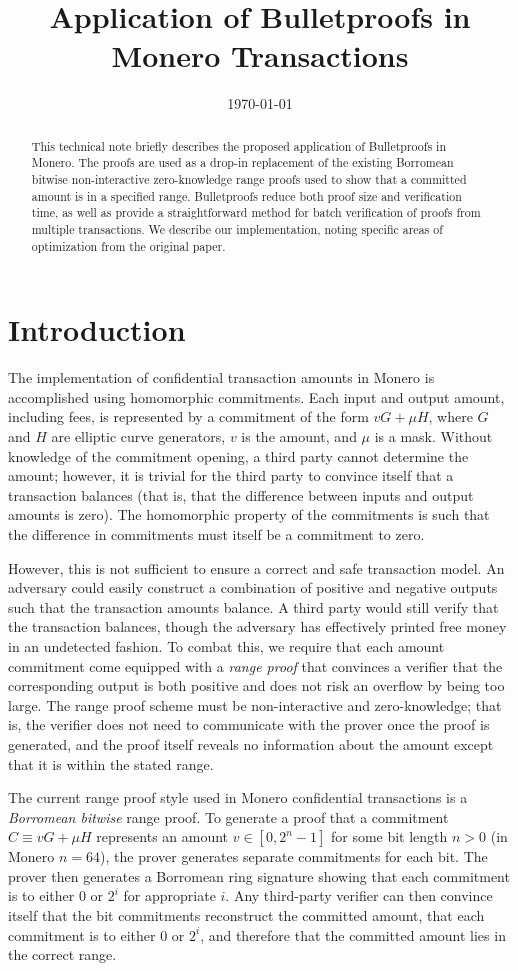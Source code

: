 \documentclass{mrl}
\title{Application of Bulletproofs in Monero Transactions}
\date{\today}
\begin{document}
\begin{abstract}
This technical note briefly describes the proposed application of Bulletproofs \cite{bp} in Monero. The proofs are used as a drop-in replacement of the existing Borromean bitwise non-interactive zero-knowledge range proofs used to show that a committed amount is in a specified range. Bulletproofs reduce both proof size and verification time, as well as provide a straightforward method for batch verification of proofs from multiple transactions. We describe our implementation, noting specific areas of optimization from the original paper.
\end{abstract}

\section{Introduction}
The implementation of confidential transaction amounts in Monero is accomplished using homomorphic commitments. Each input and output amount, including fees, is represented by a commitment of the form $vG + \mu H$, where $G$ and $H$ are elliptic curve generators, $v$ is the amount, and $\mu$ is a mask. Without knowledge of the commitment opening, a third party cannot determine the amount; however, it is trivial for the third party to convince itself that a transaction balances (that is, that the difference between inputs and output amounts is zero). The homomorphic property of the commitments is such that the difference in commitments must itself be a commitment to zero.

However, this is not sufficient to ensure a correct and safe transaction model. An adversary could easily construct a combination of positive and negative outputs such that the transaction amounts balance. A third party would still verify that the transaction balances, though the adversary has effectively printed free money in an undetected fashion. To combat this, we require that each amount commitment come equipped with a \textit{range proof} that convinces a verifier that the corresponding output is both positive and does not risk an overflow by being too large. The range proof scheme must be non-interactive and zero-knowledge; that is, the verifier does not need to communicate with the prover once the proof is generated, and the proof itself reveals no information about the amount except that it is within the stated range.

The current range proof style used in Monero confidential transactions is a \textit{Borromean bitwise} range proof. To generate a proof that a commitment $C \equiv vG + \mu H$ represents an amount $v \in [0,2^n-1]$ for some bit length $n > 0$ (in Monero $n = 64$), the prover generates separate commitments for each bit. The prover then generates a Borromean ring signature showing that each commitment is to either $0$ or $2^i$ for appropriate $i$. Any third-party verifier can then convince itself that the bit commitments reconstruct the committed amount, that each commitment is to either $0$ or $2^i$, and therefore that the committed amount lies in the correct range.
\end{document}
